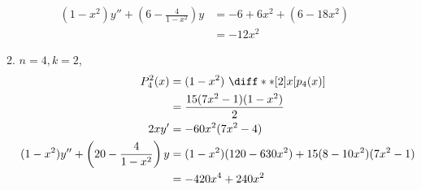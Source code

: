 \begin{enumerate}
\begin{enumerate}
\begin{align}
                        (1 - x^2)y'' + \left(6 - \frac{4}{1-x^2} \right)y
                                  & = -6 + 6x^2 + (6 - 18x^2)         \\
                                  & = -12x^2
                    \end{align}
              \item $ n = 4, k = 2 $,
                    \begin{align}
                        P_4^2 (x) & = (1 - x^2)\ \diff**[2]{x}{\left[
                        p_4(x) \right]}                               \\
                                  & = \frac{15(7x^2 - 1)(1 - x^2)}{2} \\
                        2xy'      & = -60x^2(7x^2 - 4)                \\
                        (1 - x^2)y'' + \left(20 - \frac{4}{1-x^2} \right)y
                                  & = (1-x^2)(120 - 630x^2)
                        + 15(8 - 10x^2)(7x^2 - 1)                    \\
                                  & = -420x^4 + 240x^2
                    \end{align}
          \end{enumerate}
\end{enumerate}